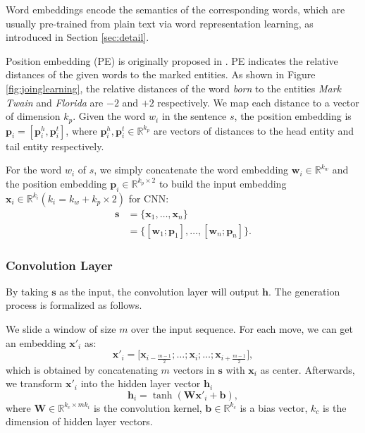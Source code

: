 \documentclass[11pt,a4paper]{article}
\begin{document}
Word embeddings encode the semantics of the corresponding words, which are usually pre-trained from plain text via word representation learning, as introduced in Section \ref{sec:detail}.

Position embedding (PE) is originally proposed in \cite{zeng2014relation}. PE indicates the relative distances of the given words to the marked entities. As shown in Figure \ref{fig:joinglearning}, the relative distances of the word \emph{born} to the entities \emph{Mark Twain} and \emph{Florida} are $-2$ and $+2$ respectively. We map each distance to a vector of dimension $k_p$. Given the word $w_i$ in the sentence $s$, the position embedding is $\mathbf{p}_i = [\mathbf{p}^h_i, \mathbf{p}^t_i]$, where $\mathbf{p}^h_i, \mathbf{p}^t_i \in \mathbb{R}^{k_p}$ are vectors of distances to the head entity and tail entity respectively.

For the word $w_i$ of $s$, we simply concatenate the word embedding $\mathbf{w}_i \in \mathbb{R}^{k_w} $ and the position embedding $\mathbf{p}_i \in \mathbb{R}^{k_p \times 2} $ to build the input embedding $\mathbf{x}_i \in \mathbb{R}^{k_i} (k_i = k_w + k_p \times 2)$ for CNN:
\begin{align}
\mathbf{s} & = \{\mathbf{x}_1,\ldots, \mathbf{x}_n\} \\\nonumber
&=\{[\mathbf{w}_1;\mathbf{p}_1],\ldots, [\mathbf{w}_n;\mathbf{p}_n]\}.
\end{align}


\subsubsection{Convolution Layer}
By taking $\mathbf{s}$ as the input, the convolution layer will output $\mathbf{h}$. The generation process is formalized as follows.

We slide a window of size $m$ over the input sequence. For each move, we can get an embedding $\mathbf{x}'_i$ as:
\begin{equation}
\mathbf{x}'_i = \big[ \mathbf{x}_{i - \frac{m-1}{2}}; \ldots ; \mathbf{x}_i; \ldots ;\mathbf{x}_{i + \frac{m-1}{2}} \big],
\end{equation}
which is obtained by concatenating $m$ vectors in $\mathbf{s}$ with $\mathbf{x}_i$ as center. Afterwards, we transform $\mathbf{x}'_i$ into the hidden layer vector $\mathbf{h}_i$
\begin{equation}
\mathbf{h}_i = \tanh(\mathbf{W}\mathbf{x}'_i + \mathbf{b}),
\end{equation}
where $\mathbf{W} \in \mathbb{R}^{k_c \times mk_i}$ is the convolution kernel, $\mathbf{b} \in \mathbb{R}^{k_c}$ is a bias vector, $k_c$ is the dimension of hidden layer vectors.
\end{document}
